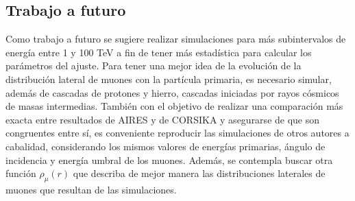 \subsection*{Trabajo a futuro}
Como trabajo a futuro se sugiere realizar simulaciones para m\'as subintervalos de energ\'ia entre 1 y 100 TeV a fin de tener m\'as estad\'istica para calcular los par\'ametros del ajuste. Para tener una mejor idea de la evoluci\'on de la distribuci\'on lateral de muones con la part\'icula primaria, es necesario simular, adem\'as de cascadas de protones y hierro, cascadas iniciadas por rayos c\'osmicos de masas intermedias. Tambi\'en con el objetivo de realizar una comparaci\'on m\'as exacta entre resultados de AIRES y de CORSIKA y asegurarse de que son congruentes entre s\'i, es conveniente reproducir las simulaciones de otros autores a cabalidad, considerando los mismos valores de energ\'ias primarias, \'angulo de incidencia y energ\'ia umbral de los muones. Adem\'as, se contempla buscar otra funci\'on $\rho_{\mu}(r)$ que describa de mejor manera las distribuciones laterales de muones que resultan de las simulaciones. 

\singlespacing

